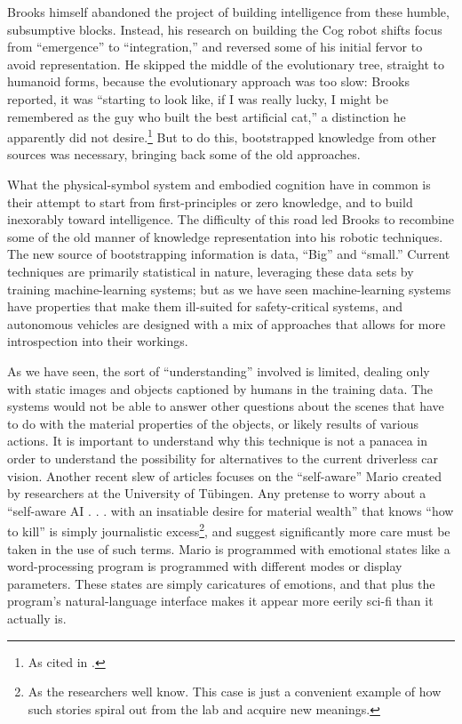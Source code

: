 Brooks himself abandoned the project of building intelligence from
these humble, subsumptive blocks. Instead, his research on building
the Cog robot shifts focus from ``emergence'' to ``integration,'' and
reversed some of his initial fervor to avoid representation.\cite[p.
  258]{ekbia} He skipped the middle of the evolutionary tree, straight
to humanoid forms, because the evolutionary approach was too slow: 
Brooks reported, it was ``starting to look like, if I was really
lucky, I might be remembered as the guy who built the best artificial
cat,'' a distinction he apparently did not desire.\cite[p.
  65]{brooksflesh}\footnote{As cited in \cite[p. 258]{ekbia}.}
But to do this, bootstrapped knowledge from other sources was
necessary, bringing back some of the old approaches.

What the physical-symbol system and embodied cognition
have in common is their attempt to start from first-principles or zero
knowledge, and to build inexorably toward intelligence. The difficulty
of this road led Brooks to recombine some of the old manner of
knowledge representation into his robotic techniques. The new source
of bootstrapping information is data, ``Big'' and ``small.'' Current
techniques are primarily statistical in nature, leveraging these data
sets by training machine-learning systems; but as we have seen
machine-learning systems have properties that make them ill-suited for
safety-critical systems, and autonomous vehicles are designed with a
mix of approaches that allows for more introspection into their
workings.

As we have seen, the sort of ``understanding''
involved is limited, dealing only with static images and objects
captioned by humans in the training data. The systems would not be
able to answer other questions about the scenes that have to do with
the material properties of the objects, or likely results of various
actions.\cite{gomesJordan} It is important to understand why this technique is not a
panacea in order to understand the possibility for alternatives to the current
driverless car vision. Another recent slew of articles focuses on
the ``self-aware'' Mario created by researchers at the University of
T\"{u}bingen. Any pretense to worry about a ``self-aware AI . . . with
an insatiable desire for material wealth'' that knows ``how to kill''\cite{vincentMario}
is simply journalistic excess\footnote{As the
  researchers well know. This case is just a convenient example of how
such stories spiral out from the lab and acquire new meanings.}, and suggest
significantly more care must be taken in the use of such terms. Mario
is programmed with emotional states like a word-processing program is
programmed with different modes or display parameters. These states
are simply caricatures of emotions, and that plus the program's
natural-language interface makes it appear more eerily sci-fi than it
actually is.


